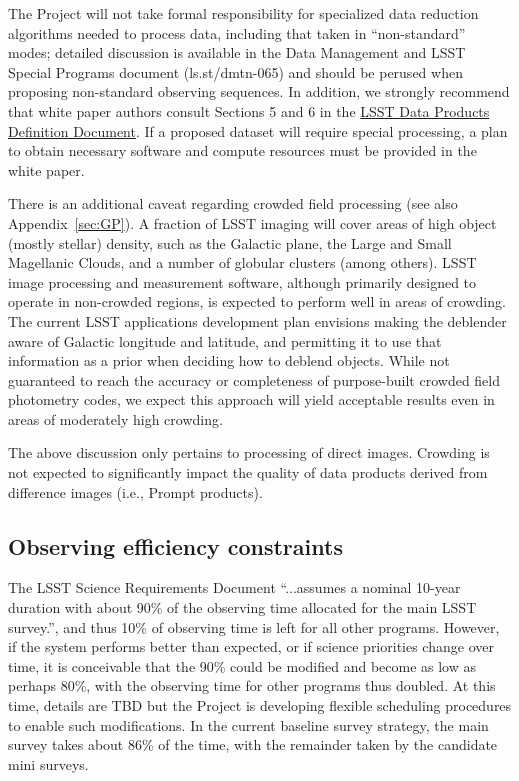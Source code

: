\documentclass[DM,lsstdraft,toc,usenatbib]{lsstdoc}
\begin{document}
The Project will not take formal responsibility for specialized data reduction algorithms 
needed to process data, including that taken in ``non-standard'' modes; detailed discussion is 
available in the Data Management and LSST Special Programs document (ls.st/dmtn-065) and should
be perused when proposing non-standard observing sequences. In addition, we strongly recommend 
that white paper authors consult Sections 5 and 6 in the \href{http://ls.st/dpdd}{LSST Data Products Definition Document}. If 
a proposed dataset will require special processing, a plan to obtain necessary software and compute resources 
must be provided in the white paper. 

There is an additional caveat regarding crowded field processing (see also Appendix~\ref{sec:GP}). 
A fraction of LSST imaging will cover areas of high object (mostly stellar) density, such as the 
Galactic plane, the Large and Small Magellanic Clouds, and a number of globular clusters (among 
others). LSST image processing and measurement software, although primarily designed to operate 
in non-crowded regions, is expected to perform well in areas of crowding. The current LSST applications 
development plan envisions making the deblender aware of Galactic longitude and latitude, and 
permitting it to use that information as a prior when deciding how to deblend objects. While not 
guaranteed to reach the accuracy or completeness of purpose-built crowded field photometry codes, 
we expect this approach will yield acceptable results even in areas of moderately high crowding.

The above discussion only pertains to processing of direct images. Crowding is not expected to 
significantly impact the quality of data products derived from difference images (i.e., Prompt 
products).


\subsection{Observing efficiency constraints} 

The LSST Science Requirements Document  ``...assumes a nominal 10-year duration with about 90\% 
of the observing time allocated for the main LSST survey.'', and thus 10\% of observing time is left for 
all other programs. However, if the system performs better than expected, or if science priorities 
change over time, it is conceivable that the 90\% could be modified and become as low as perhaps 80\%, 
with the observing time for other programs thus doubled. At this time, details are TBD but the Project
is developing flexible scheduling procedures to enable such modifications. In the current baseline
survey strategy, the main survey takes about 86\% of the time, with the remainder taken by the candidate mini surveys. 
\end{document}
